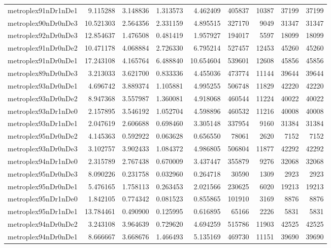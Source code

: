 \documentclass[../../../thesis.tex]{subfiles}
\begin{document}
\begin{longtable}{|l|r|r|r|r|r|r|r|r|}
metroplex91nDr1nDe1 & 9.115288 & 3.148836 & 1.313573 & 4.462409 & 405837 & 10387 & 37199 & 37199 \\
metroplex90nDr0nDe3 & 10.521303 & 2.564356 & 2.331159 & 4.895515 & 327170 & 9049 & 31347 & 31347 \\
metroplex92nDr0nDe3 & 12.854637 & 1.476508 & 0.481419 & 1.957927 & 194017 & 5597 & 18099 & 18099 \\
metroplex91nDr0nDe2 & 10.471178 & 4.068884 & 2.726330 & 6.795214 & 527457 & 12453 & 45260 & 45260 \\
metroplex91nDr0nDe1 & 17.243108 & 4.165764 & 6.488840 & 10.654604 & 539601 & 12608 & 45856 & 45856 \\
metroplex89nDr0nDe3 & 3.213033 & 3.621700 & 0.833336 & 4.455036 & 473774 & 11144 & 39644 & 39644 \\
metroplex93nDr0nDe1 & 4.696742 & 3.889374 & 1.105881 & 4.995255 & 506748 & 11829 & 42220 & 42220 \\
metroplex93nDr0nDe2 & 8.947368 & 3.557987 & 1.360081 & 4.918068 & 460544 & 11224 & 40022 & 40022 \\
metroplex93nDr1nDe0 & 2.157895 & 3.546192 & 1.052704 & 4.598896 & 460532 & 11216 & 40008 & 40008 \\
metroplex93nDr1nDe1 & 2.047619 & 2.606688 & 0.698460 & 3.305148 & 337954 & 9160 & 31384 & 31384 \\
metroplex95nDr0nDe2 & 4.145363 & 0.592922 & 0.063628 & 0.656550 & 78061 & 2620 & 7152 & 7152 \\
metroplex93nDr0nDe3 & 3.102757 & 3.902433 & 1.084372 & 4.986805 & 506804 & 11877 & 42292 & 42292 \\
metroplex94nDr1nDe0 & 2.315789 & 2.767438 & 0.670009 & 3.437447 & 355879 & 9276 & 32068 & 32068 \\
metroplex95nDr0nDe3 & 8.090226 & 0.231758 & 0.032960 & 0.264718 & 30590 & 1309 & 2923 & 2923 \\
metroplex95nDr0nDe1 & 5.476165 & 1.758113 & 0.263453 & 2.021566 & 230625 & 6020 & 19213 & 19213 \\
metroplex95nDr1nDe0 & 1.842105 & 0.774342 & 0.081523 & 0.855865 & 101910 & 3169 & 8876 & 8876 \\
metroplex95nDr1nDe1 & 13.784461 & 0.490900 & 0.125995 & 0.616895 & 65166 & 2226 & 5831 & 5831 \\
metroplex94nDr0nDe2 & 3.243108 & 3.964639 & 0.729620 & 4.694259 & 515786 & 11903 & 42525 & 42525 \\
metroplex94nDr0nDe1 & 8.666667 & 3.668676 & 1.466493 & 5.135169 & 469730 & 11151 & 39690 & 39690 \\

\end{longtable}
\end{document}
